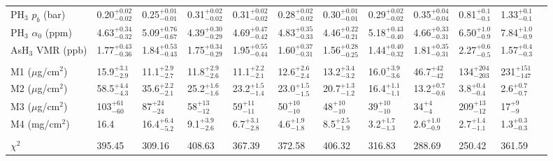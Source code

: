 \documentclass[article,11pt]{emulateapj}
\def\asht{AsH$_3$ }
\def\pht{PH$_3$ }
\begin{document}
\begin{table*}[!htb]
\begin{scriptsize}
\begin{tabular}{l l l l l l l l l l l l}
     \pht $p_b$ (bar) &  0.20$^{+ 0.02}_{- 0.02}$ &  0.25$^{+ 0.01}_{- 0.01}$ &  0.31$^{+ 0.02}_{- 0.02}$ &  0.31$^{+ 0.02}_{- 0.02}$ &  0.28$^{+ 0.02}_{- 0.02}$ &  0.30$^{+ 0.01}_{- 0.01}$ &  0.29$^{+ 0.02}_{- 0.02}$ &  0.35$^{+ 0.04}_{- 0.04}$ &  0.81$^{+ 0.1}_{- 0.1}$ &  1.33$^{+ 0.1}_{- 0.1}$\\[0.05in]
    \pht $\alpha_0$ (ppm) &  4.63$^{+ 0.34}_{- 0.32}$ &  5.09$^{+ 0.76}_{- 0.67}$ &  4.39$^{+ 0.30}_{- 0.29}$ &  4.69$^{+ 0.47}_{- 0.42}$ &  4.83$^{+ 0.35}_{- 0.33}$ &  4.46$^{+ 0.22}_{- 0.21}$ &  5.18$^{+ 0.43}_{- 0.40}$ &  4.66$^{+ 0.33}_{- 0.31}$ &  6.50$^{+ 1.0}_{- 0.9}$ &  7.84$^{+ 1.0}_{- 0.9}$\\[0.05in]
     \asht VMR (ppb) &  1.77$^{+ 0.43}_{- 0.36}$ &  1.84$^{+ 0.53}_{- 0.43}$ &  1.75$^{+ 0.34}_{- 0.29}$ &  1.95$^{+ 0.55}_{- 0.44}$ &  1.60$^{+ 0.37}_{- 0.31}$ &  1.56$^{+ 0.28}_{- 0.25}$ &  1.44$^{+ 0.40}_{- 0.32}$ &  1.81$^{+ 0.35}_{- 0.31}$ &  2.27$^{+ 0.6}_{- 0.5}$ &  1.57$^{+ 0.4}_{- 0.3}$\\[0.05in]
\hline\\[-0.1in]
M1 ($\mu$g/cm$^2$)&     15.9$^{+  3.1}_{-  2.9}$&     11.1$^{+  2.9}_{-  2.7}$&     11.8$^{+  2.9}_{-  2.6}$&     11.1$^{+  2.2}_{-  2.1}$&     12.6$^{+  2.6}_{-  2.4}$&     13.2$^{+  3.4}_{-  3.2}$&     16.0$^{+  3.9}_{-  3.6}$&     46.7$^{+ 42}_{- 42}$&    134$^{+204}_{-203}$&    231$^{+151}_{-147}$\\[0.05in]
M2 ($\mu$g/cm$^2$)&     58.5$^{+  4.4}_{-  4.3}$&     35.6$^{+  2.2}_{-  2.1}$&     25.2$^{+  1.6}_{-  1.6}$&     23.2$^{+  1.5}_{-  1.4}$&     23.0$^{+  1.5}_{-  1.5}$&     20.7$^{+  1.3}_{-  1.2}$&     16.4$^{+  1.1}_{-  1.1}$&     13.2$^{+  0.7}_{-  0.6}$&      3.8$^{+  0.4}_{-  0.4}$&      2.6$^{+  0.7}_{-  0.7}$\\[0.05in]
M3 ($\mu$g/cm$^2$)&    103$^{+ 61}_{- 60}$&     87$^{+ 24}_{- 24}$&     58$^{+ 13}_{- 12}$&     59$^{+ 11}_{- 11}$&     50$^{+ 10}_{- 10}$&     48$^{+ 10}_{- 10}$&     39$^{+ 10}_{-  10}$&     34$^{+  4}_{-  4}$&    209$^{+ 13}_{- 12}$&     17$^{+  9}_{-  9}$\\[0.05in]
M4 (mg/cm$^2$)&     16.4&     16.4$^{+  6.4}_{-  5.2}$&      9.1$^{+  3.9}_{-  2.6}$&      6.7$^{+  3.1}_{-  2.8}$&      4.6$^{+  1.9}_{-  1.8}$&      8.5$^{+  2.5}_{-  1.9}$&      3.2$^{+  1.7}_{-  1.3}$&      2.6$^{+  1.0}_{-  0.9}$&      2.7$^{+  1.4}_{-  1.1}$&      1.3$^{+  0.3}_{-  0.3}$\\[0.05in]
\hline\\[-0.1in]
$\chi^2$ & 395.45 & 309.16 & 408.63 & 367.39 & 372.58 & 406.32 & 316.83 & 288.69 & 250.42 & 361.59\\[0.05in]

\end{tabular}
\end{scriptsize}
\end{table*}
\end{document}
